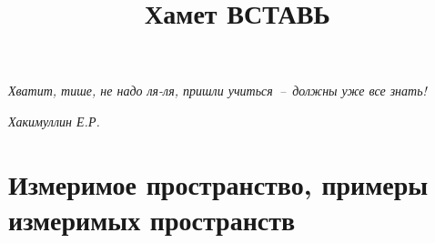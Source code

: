 \documentclass[a4paper,14pt,russian]{article}
\begin{document}
\title{Хамет ВСТАВЬ}
\maketitle
\epigraph{\textit{Хватит, тише, не надо ля-ля, пришли учиться~--~должны уже все знать!}}{\textit{Хакимуллин Е.Р.}}

\section{Измеримое пространство, примеры измеримых пространств}


\end{document}
